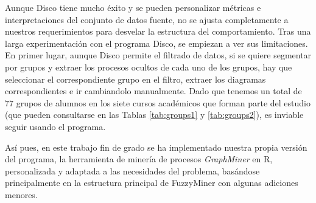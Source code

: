 Aunque Disco tiene mucho éxito y se pueden personalizar métricas e interpretaciones del conjunto de datos fuente, no se ajusta completamente a nuestros requerimientos para desvelar la estructura del comportamiento. Tras una larga experimentación con el programa Disco, se empiezan a ver sus limitaciones. En primer lugar, aunque Disco permite el filtrado de datos, si se quiere segmentar por grupos y extraer los procesos ocultos de cada uno de los grupos, hay que seleccionar el correspondiente grupo en el filtro, extraer los diagramas correspondientes e ir cambiandolo manualmente. Dado que tenemos un total de $77$ grupos de alumnos en los siete cursos académicos que forman parte del estudio (que pueden consultarse en las Tablas \ref{tab:groups1} y \ref{tab:groups2}), es inviable seguir usando el programa.

Así pues, en este trabajo fin de grado se ha implementado nuestra propia versión del programa, la herramienta de minería de procesos \emph{GraphMiner} en R, personalizada y adaptada a las necesidades del problema, basándose principalmente en la estructura principal de FuzzyMiner \cite{gunther2007fuzzy} con algunas adiciones menores.